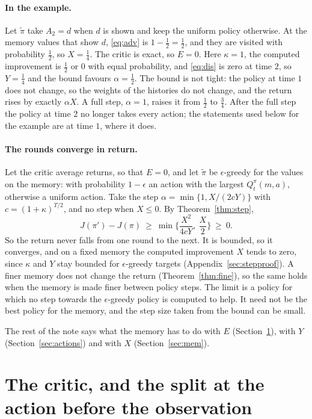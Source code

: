\documentclass{article}
\theoremstyle{definition}
\begin{document}
\paragraph{In the example.} Let $\tilde\pi$ take $A_2=d$ when $d$ is shown and keep the uniform policy otherwise. At the memory values that show $d$, \eqref{eq:adv} is $1-\tfrac12=\tfrac12$, and they are visited with probability $\tfrac12$, so $X=\tfrac14$. The critic is exact, so $E=0$. Here $\kappa=1$, the computed improvement is $\tfrac12$ or $0$ with equal probability, and \eqref{eq:dis} is zero at time $2$, so $Y=\tfrac14$ and the bound favours $\alpha=\tfrac12$. The bound is not tight: the policy at time $1$ does not change, so the weights of the histories do not change, and the return rises by exactly $\alpha X$. A full step, $\alpha=1$, raises it from $\tfrac12$ to $\tfrac34$. After the full step the policy at time $2$ no longer takes every action; the statements used below for the example are at time $1$, where it does.

\paragraph{The rounds converge in return.} Let the critic average returns, so that $E=0$, and let $\tilde\pi$ be $\epsilon$-greedy for the values on the memory: with probability $1-\epsilon$ an action with the largest $Q^\pi_t(m,a)$, otherwise a uniform action. Take the step $\alpha=\min\{1,X/(2cY)\}$ with $c=(1+\kappa)^{T/2}$, and no step when $X\le0$. By Theorem~\ref{thm:step},
\[
J(\pi')-J(\pi)\ \ge\ \min\Big\{\frac{X^2}{4cY},\ \frac X2\Big\}\ \ge\ 0 .
\]
So the return never falls from one round to the next. It is bounded, so it converges, and on a fixed memory the computed improvement $X$ tends to zero, since $\kappa$ and $Y$ stay bounded for $\epsilon$-greedy targets (Appendix~\ref{sec:stepproof}). A finer memory does not change the return (Theorem~\ref{thm:fine}), so the same holds when the memory is made finer between policy steps. The limit is a policy for which no step towards the $\epsilon$-greedy policy is computed to help. It need not be the best policy for the memory, and the step size taken from the bound can be small.

The rest of the note says what the memory has to do with $E$ (Section~\ref{sec:eval}), with $Y$ (Section~\ref{sec:actions}) and with $X$ (Section~\ref{sec:mem}).

\section{The critic, and the split at the action before the observation}\label{sec:eval}
\end{document}
